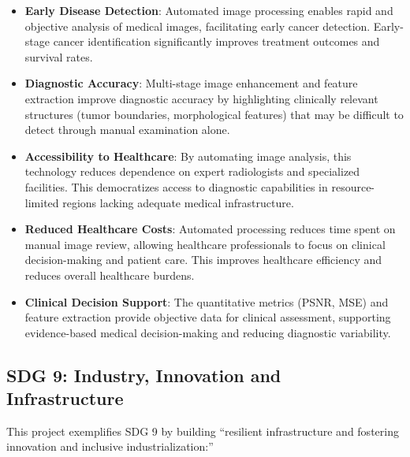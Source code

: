 \documentclass[12pt,a4paper]{article}
\begin{document}
\begin{itemize}
    \item \textbf{Early Disease Detection}: Automated image processing enables rapid and objective analysis of medical images, facilitating early cancer detection. Early-stage cancer identification significantly improves treatment outcomes and survival rates.
    
    \item \textbf{Diagnostic Accuracy}: Multi-stage image enhancement and feature extraction improve diagnostic accuracy by highlighting clinically relevant structures (tumor boundaries, morphological features) that may be difficult to detect through manual examination alone.
    
    \item \textbf{Accessibility to Healthcare}: By automating image analysis, this technology reduces dependence on expert radiologists and specialized facilities. This democratizes access to diagnostic capabilities in resource-limited regions lacking adequate medical infrastructure.
    
    \item \textbf{Reduced Healthcare Costs}: Automated processing reduces time spent on manual image review, allowing healthcare professionals to focus on clinical decision-making and patient care. This improves healthcare efficiency and reduces overall healthcare burdens.
    
    \item \textbf{Clinical Decision Support}: The quantitative metrics (PSNR, MSE) and feature extraction provide objective data for clinical assessment, supporting evidence-based medical decision-making and reducing diagnostic variability.
\end{itemize}

\subsection{SDG 9: Industry, Innovation and Infrastructure}

This project exemplifies SDG 9 by building ``resilient infrastructure and fostering innovation and inclusive industrialization:''
\end{document}
